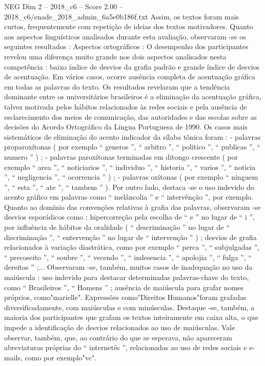 \begin{textsample}{NEG Dim 2 – 2018\_c6 – Score 2.00 – 2018\_c6/enade\_2018\_admin\_6a5e0b186f.txt}
Assim, os textos foram mais curtos, frequentemente com repetição de ideias dos textos motivadores.
Quanto aos aspectos linguísticos analisados durante esta avaliação, observaram -se os seguintes resultados : Aspectos ortográficos : O desempenho dos participantes revelou uma diferença muito grande nos dois aspectos analisados nesta competência : baixo índice de desvios da grafia padrão e grande índice de desvios de acentuação.
Em vários casos, ocorre ausência completa de acentuação gráfica em todas as palavras do texto.
Os resultados revelaram que a tendência dominante entre os universitários brasileiros é a eliminação da acentuação gráfica, talvez motivada pelos hábitos relacionados às redes sociais e pela ausência de esclarecimento dos meios de comunicação, das autoridades e das escolas sobre as decisões do Acordo Ortográfico da Língua Portuguesa de 1990.
Os casos mais sistemáticos de eliminação do acento indicador da sílaba tônica foram : - palavras proparoxítonas ( por exemplo “ generos ”, “ arbitro ”, “ politico ”, “ publicas ”, “ numero ” ) ; - palavras paroxítonas terminadas em ditongo crescente ( por exemplo “ area ”, “ noticiarios ”, “ individuo ”, “ historia ”, “ varios ”, “ noticia ”, “ negligencia ”, “ ocorrencia ” ) ; - palavras oxítonas ( por exemplo “ ninguem ”, “ esta ”, “ ate ”, “ tambem ” ).
Por outro lado, destaca -se o uso indevido do acento gráfico em palavras como “ melâncolia ” e “ intervênção ”, por exemplo.
Quanto ao domínio das convenções relativas à grafia das palavras, observaram -se desvios esporádicos como : hipercorreção pela escolha de “ e ” no lugar de “ i ”, por influência de hábitos da oralidade ( “ descriminação ” no lugar de “ discriminação ”, “ entervenção ” no lugar de “ intervenção ” ) ; desvios de grafia relacionados à variação diastrática, como por exemplo “ perca ”, “ subjulgadas ”, “ precoseito ”, “ soubre ”, “ vecendo ”, “ indesencia ”, “ apolojia ”, “ fulga ”, “ dereitos ” ;...
Observaram -se, também, muitos casos de inadequação no uso da maiúscula : uso indevido para destacar determinadas palavras-chave do texto, como “ Brasileiros ”, “ Homens ” ; ausência de maiúscula para grafar nomes próprios, como"marielle".
Expressões como"Direitos Humanos"foram grafadas diversificadamente, com maiúsculas e com minúsculas.
Destaque -se, também, a maioria dos participantes que grafam os textos inteiramente em caixa alta, o que impede a identificação de desvios relacionados ao uso de maiúsculas.
Vale observar, também, que, ao contrário do que se esperava, não apareceram abreviaturas próprias do “ internetês ”, relacionadas ao uso de redes sociais e e-mails, como por exemplo"vc".

\end{textsample}
